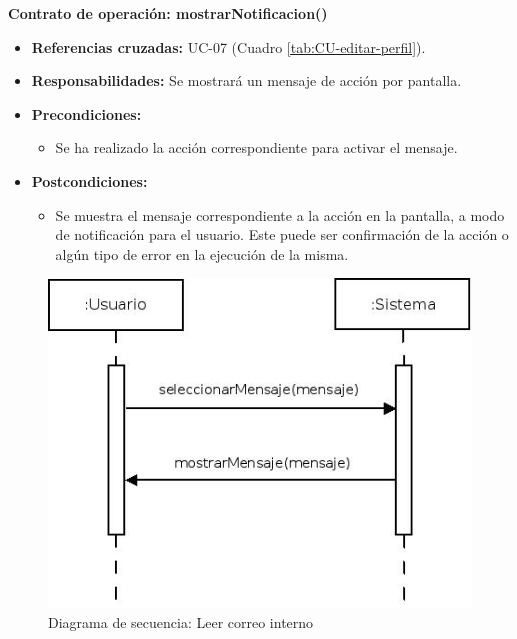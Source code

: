 \textbf{Contrato de operación: mostrarNotificacion()}
\begin{itemize}
\item \textbf{Referencias cruzadas:} UC-07 (Cuadro \ref{tab:CU-editar-perfil}).
\item \textbf{Responsabilidades:} Se mostrará un mensaje de acción por pantalla.
\item \textbf{Precondiciones:} 
 \begin{itemize}
\item Se ha realizado la acción correspondiente para activar el mensaje.
\end {itemize}
\item \textbf{Postcondiciones:} 
 \begin{itemize}
\item Se muestra el mensaje correspondiente a la acción en la pantalla, a modo de notificación para el usuario. Este puede ser confirmación de la acción o algún tipo de error en la ejecución de la misma.
\end {itemize}
\end {itemize}


\vspace{10mm}

\begin{figure}[H]
\centering
  \includegraphics[scale=.55]{img/secuencias/gestion-servicios-leer-correo.jpeg}
  \caption{Diagrama de secuencia: Leer correo interno}
  \label{fig:secuencia-gestion-servicios-leer-correo}
\end{figure}

